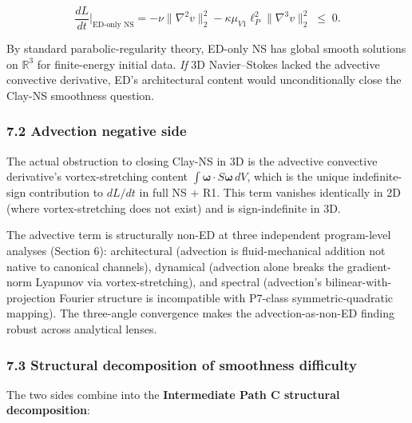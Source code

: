 \documentclass[
]{article}
\begin{document}
\[\frac{dL}{dt}\bigg|_\text{ED-only NS} = -\nu\|\nabla^2 v\|_2^2 - \kappa\mu_{V1}\ell_P^2 \|\nabla^3 v\|_2^2 \;\le\; 0.\]

By standard parabolic-regularity theory, ED-only NS has global smooth
solutions on \(\mathbb{R}^3\) for finite-energy initial data. \emph{If}
3D Navier--Stokes lacked the advective convective derivative, ED's
architectural content would unconditionally close the Clay-NS smoothness
question.

\subsubsection{7.2 Advection negative
side}\label{advection-negative-side}

The actual obstruction to closing Clay-NS in 3D is the advective
convective derivative's vortex-stretching content
\(\int \boldsymbol{\omega} \cdot S\boldsymbol{\omega} \, dV\), which is
the unique indefinite-sign contribution to \(dL/dt\) in full NS + R1.
This term vanishes identically in 2D (where vortex-stretching does not
exist) and is sign-indefinite in 3D.

The advective term is structurally non-ED at three independent
program-level analyses (Section 6): architectural (advection is
fluid-mechanical addition not native to canonical channels), dynamical
(advection alone breaks the gradient-norm Lyapunov via
vortex-stretching), and spectral (advection's bilinear-with-projection
Fourier structure is incompatible with P7-class symmetric-quadratic
mapping). The three-angle convergence makes the advection-as-non-ED
finding robust across analytical lenses.

\subsubsection{7.3 Structural decomposition of smoothness
difficulty}\label{structural-decomposition-of-smoothness-difficulty}

The two sides combine into the \textbf{Intermediate Path C structural
decomposition}:
\end{document}
